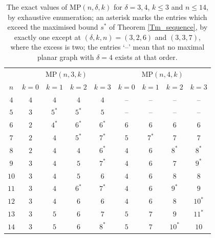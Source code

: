\documentclass[12pt,a4paper]{article}%
\begin{document}
\begin{table}[ht]
\small
\begin{center}
\begin{tabular}{|c|cccc|cccc|}
\hline
& \multicolumn{4}{c|}{$\mathrm{MP}(n,3,k)$} & \multicolumn{4}{c|}{$\mathrm{MP}(n,4,k)$}\\
$n$ & $k=0$ & $k=1$ & $k=2$ & $k=3$ & $k=0$ & $k=1$ & $k=2$ & $k=3$\\ \hline
$4$ & $4$ & $4$ & $4$ & $4$ & -- & -- & -- & --\\
$5$ & $3$ & $5^{\ast }$ & $5^{\ast }$ & $5$ & -- & -- & -- & --\\
$6$ & $2$ & $4^{\ast }$ & $6^{\ast }$ & $6^{\ast }$ & $6$ & $6$ & $6$ & $6$\\
$7$ & $2$ & $4$ & $5^{\ast }$ & $7^{\ast }$ & $5$ & $7^{\ast }$ & $7$ & $7$\\
$8$ & $2$ & $4$ & $4$ & $6^{\ast }$ & $4$ & $6$ & $8^{\ast }$ & $8^{\ast }$\\
$9$ & $3$ & $4$ & $5$ & $7^{\ast }$ & $4$ & $6$ & $7$ & $9^{\ast }$\\
$10$ & $3$ & $4$ & $5$ & $6$ & $4$ & $6$ & $8$ & $8$\\
$11$ & $3$ & $4$ & $6^{\ast }$ & $7^{\ast }$ & $4$ & $6$ & $9^{\ast }$ & $9$\\
$12$ & $3$ & $4$ & $6$ & $6$ & $4$ & $6$ & $8$ & $10^{\ast }$\\
$13$ & $3$ & $5$ & $6$ & $7$ & $5$ & $7$ & $9$ & $11^{\ast }$\\
$14$ & $3$ & $5$ & $6$ & $8^{\ast }$ & $5$ & $7$ & $10^{\ast }$ & $10$\\ \hline
\end{tabular}
\end{center}
\caption{The exact values of $\mathrm{MP}(n,\delta ,k)$ for $\delta =3,4$, $k\leq 3$ and $n\leq 14$,
by exhaustive enumeration; an asterisk marks the entries which exceed the maximised bound $s^{\ast }$
of Theorem \ref{Tm_sequence}, by exactly one except at $(\delta ,k,n)=(3,2,6)$ and $(3,3,7)$, where the excess
is two; the entries `--' mean that no maximal planar graph with $\delta =4$ exists at that order.}%
\label{Tab_MP34small}%
\end{table}
\end{document}
